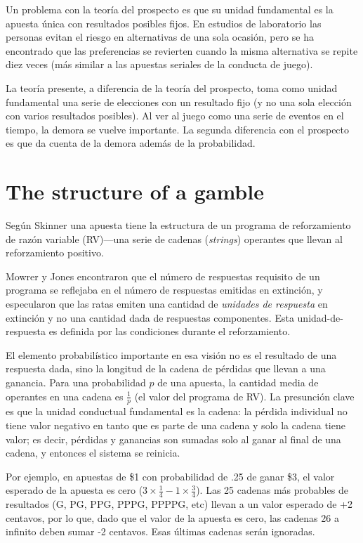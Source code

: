 \documentclass[a4paper,12pt]{article}
\begin{document}
Un problema con la teoría del prospecto es que su unidad fundamental es la apuesta única con resultados posibles fijos. En estudios de laboratorio las personas evitan el riesgo en alternativas de una sola ocasión, pero se ha encontrado que las preferencias se revierten cuando la misma alternativa se repite diez veces (más similar a las apuestas seriales de la conducta de juego).

La teoría presente, a diferencia de la teoría del prospecto, toma como unidad fundamental una serie de elecciones con un resultado fijo (y no una sola elección con varios resultados posibles). Al ver al juego como una serie de eventos en el tiempo, la demora se vuelve importante. La segunda diferencia con el prospecto es que da cuenta de la demora además de la probabilidad.

\section{The structure of a gamble}

Según Skinner una apuesta tiene la estructura de un programa de reforzamiento de razón variable (RV)---una serie de cadenas ({\itshape strings}) operantes que llevan al reforzamiento positivo.

Mowrer y Jones encontraron que el número de respuestas requisito de un programa se reflejaba en el número de respuestas emitidas en extinción, y especularon que las ratas emiten una cantidad de {\slshape unidades de respuesta} en extinción y no una cantidad dada de respuestas componentes. Esta unidad-de-respuesta es definida por las condiciones durante el reforzamiento.

El elemento probabilístico importante en esa visión no es el resultado de una respuesta dada, sino la longitud de la cadena de pérdidas que llevan a una ganancia. Para una probabilidad $p$ de una apuesta, la cantidad media de operantes en una cadena es $ \frac{1}{p}$ (el valor del programa de RV). La presunción clave es que la unidad conductual fundamental es la cadena: la pérdida individual no tiene valor negativo en tanto que es parte de una cadena y solo la cadena tiene valor; es decir, pérdidas y ganancias son sumadas solo al ganar al final de una cadena, y entonces el sistema se reinicia.

Por ejemplo, en apuestas de \$1 con probabilidad de .25 de ganar \$3, el valor esperado de la apuesta es cero ($3 \times \frac{1}{4} - 1 \times \frac{3}{4}$). Las 25 cadenas más probables de resultados (G, PG, PPG, PPPG, PPPPG, etc) llevan a un valor esperado de +2 centavos, por lo que, dado que el valor de la apuesta es cero, las cadenas 26 a infinito deben sumar -2 centavos. Esas últimas cadenas serán ignoradas.
\end{document}
